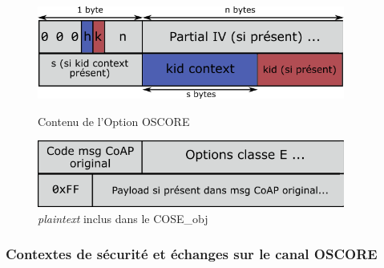 \documentclass[]{report}
\begin{document}
\newpage

\begin{figure}[!ht]
	
	\begin{minipage}{0.43\textwidth}
        \centering
		\includegraphics[width=0.9\textwidth]{OSCORE_option}
		\caption{Contenu de l'Option OSCORE}
		\label{fig:OSCORE_option}
	\end{minipage}\hfill
	\begin{minipage}{0.43\textwidth}
        \centering
        
		\includegraphics[width=0.9\textwidth]{OSCORE_plaintext}
		\caption{\textit{plaintext} inclus dans le COSE\_obj}
		\label{fig:OSCORE_plaintext}
	\end{minipage}	
\end{figure}

\subsubsection{Contextes de sécurité et échanges sur le canal OSCORE}
\label{OSCORE_contexts}
\end{document}

